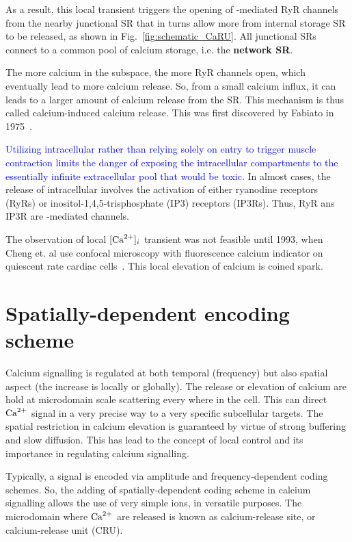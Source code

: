 As a result, this local transient triggers the opening of
-mediated RyR channels from the nearby junctional SR that in
turns allow more  from internal storage SR to be released,
as shown in Fig.~\ref{fig:schematic_CaRU}. All junctional SRs connect
to a common pool of calcium storage, i.e. the {\bf network SR}.

The more calcium in the subspace, the more RyR channels open, which
eventually lead to more calcium release. So, from a small calcium
influx, it can leads to a larger amount of calcium release from the
SR. This mechanism is thus called calcium-induced calcium release.
This was first discovered by Fabiato in 1975~\citep{fabiato1975cic}.

\begin{framed}
  \textcolor{blue}{Utilizing intracellular  rather than
    relying solely on  entry to trigger muscle contraction
    limits the danger of exposing the intracellular compartments to the
    essentially infinite extracellular  pool that would be
    toxic}.
  In almost cases, the release of intracellular  involves the
  activation of either ryanodine receptors (RyRs) or
  inositol-1,4,5-trisphosphate (IP3) receptors (IP3Rs). Thus, RyR ans
  IP3R are -mediated channels.
\end{framed}

The observation of local $[\ce{Ca^2+}]_i$ transient was not feasible
until 1993, when Cheng et. al use confocal microscopy with
fluorescence calcium indicator on quiescent rate cardiac
cells~\citep{Cheng1993Calciumspark}. This local elevation of calcium
is coined  spark.


\section{Spatially-dependent encoding scheme}

Calcium signalling is regulated at both temporal (frequency) but also spatial
aspect (the increase is locally or globally). The release or elevation of
calcium are hold at microdomain scale scattering every where in the cell. This
can direct ${\text{Ca}^{2+}}$ signal in a very precise way to a very specific subcellular
targets. The spatial restriction in calcium elevation is guaranteed by virtue of
strong buffering and slow diffusion. This has lead to the concept of local
control and its importance in regulating calcium signalling.

Typically, a signal is encoded via amplitude and frequency-dependent coding
schemes. So, the adding of spatially-dependent coding scheme in calcium
signalling allows the use of very simple ions, in versatile purposes.
The microdomain where ${\text{Ca}^{2+}}$ are released is known as calcium-release site, or
calcium-release unit (CRU). 

